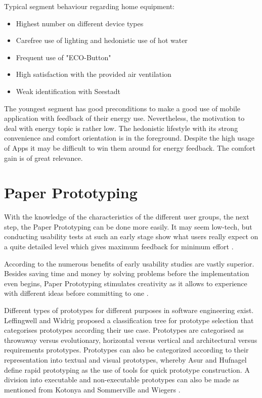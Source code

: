 Typical segment behaviour regarding home equipment:
\begin{itemize}
	\item Highest number on different device types
	\item Carefree use of lighting and hedonistic use of hot water
	\item Frequent use of "ECO-Button"
	\item High satisfaction with the provided air ventilation
	\item Weak identification with Seestadt
\end{itemize}

The youngest segment has good preconditions to make a good use of mobile application with feedback of their energy use. Nevertheless, the motivation to deal with energy topic is rather low. The hedonistic lifestyle with its strong convenience and comfort orientation is in the foreground. Despite the high usage of Apps it may be difficult to win them around for energy feedback. The comfort gain is of great relevance.

\section{Paper Prototyping}
With the knowledge of the characteristics of the different user groups, the next step, the Paper Prototyping can be done more easily. It may seem low-tech, but conducting usability tests at such an early stage show what users really expect on a quite detailed level which gives maximum feedback for minimum effort \cite{weiss2003handheld}.

According to \cite{lancaster2004paper} the numerous benefits of early usability studies are vastly superior. Besides saving time and money by solving problems before the implementation even begins, Paper Prototyping stimulates creativity as it allows to experience with different ideas before committing to one \cite{snyder2003paper}.

Different types of prototypes for different purposes in software engineering exist. Leffingwell and Widrig \cite{leffingwellmanaging} proposed a classification tree for prototype selection that categorises prototypes according their use case. Prototypes are categorised as throwaway versus evolutionary, horizontal versus vertical and architectural versus requirements prototypes. Prototypes can also be categorized according to their representation into textual and visual prototypes, whereby Asur and Hufnagel \cite{asur1993taxonomy} define rapid prototyping as the use of tools for quick prototype construction. A division into executable and non-executable prototypes can also be made as mentioned from Kotonya and Sommerville \cite{kotonya1998requirements} and Wiegers \cite{wiegers2013software}.

